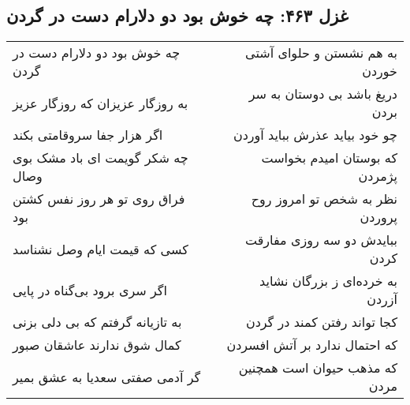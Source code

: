 \begin{center}
\section*{غزل ۴۶۳: چه خوش بود دو دلارام دست در گردن}
\label{sec:463}
\begin{longtable}{l p{0.5cm} r}
چه خوش بود دو دلارام دست در گردن
&&
به هم نشستن و حلوای آشتی خوردن
\\
به روزگار عزیزان که روزگار عزیز
&&
دریغ باشد بی دوستان به سر بردن
\\
اگر هزار جفا سروقامتی بکند
&&
چو خود بیاید عذرش بباید آوردن
\\
چه شکر گویمت ای باد مشک بوی وصال
&&
که بوستان امیدم بخواست پژمردن
\\
فراق روی تو هر روز نفس کشتن بود
&&
نظر به شخص تو امروز روح پروردن
\\
کسی که قیمت ایام وصل نشناسد
&&
ببایدش دو سه روزی مفارقت کردن
\\
اگر سری برود بی‌گناه در پایی
&&
به خرده‌ای ز بزرگان نشاید آزردن
\\
به تازیانه گرفتم که بی دلی بزنی
&&
کجا تواند رفتن کمند در گردن
\\
کمال شوق ندارند عاشقان صبور
&&
که احتمال ندارد بر آتش افسردن
\\
گر آدمی صفتی سعدیا به عشق بمیر
&&
که مذهب حیوان است همچنین مردن
\\
\end{longtable}
\end{center}
